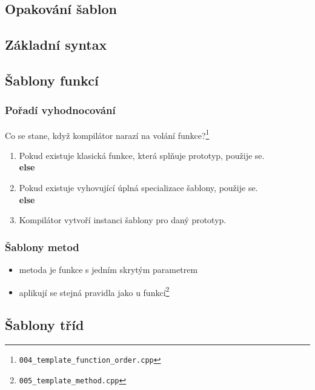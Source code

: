 



\subsection{Opakování šablon}


\subsection{Základní syntax}


	\subsection{Šablony funkcí}


	\begin{frame}
		\frametitle{Pořadí vyhodnocování}
		Co se stane, když kompilátor narazí na volání funkce?\footnote{\texttt{004\_template\_function\_order.cpp}}
		\begin{enumerate}
			\item{Pokud existuje klasická funkce, která splňuje prototyp, použije se.}\\
		\textbf{else}
			\item{Pokud existuje vyhovující úplná specializace šablony, použije se.}\\
		\textbf{else}
			\item{Kompilátor vytvoří instanci šablony pro daný prototyp.}
		\end{enumerate}
	\end{frame}

	\begin{frame}
		\frametitle{Šablony metod}
		\begin{itemize}
			\item{metoda je funkce s jedním skrytým parametrem}
			\item{aplikují se stejná pravidla jako u funkcí\footnote{\texttt{005\_template\_method.cpp}}}
		\end{itemize}
	\end{frame}

	\subsection{Šablony tříd}

